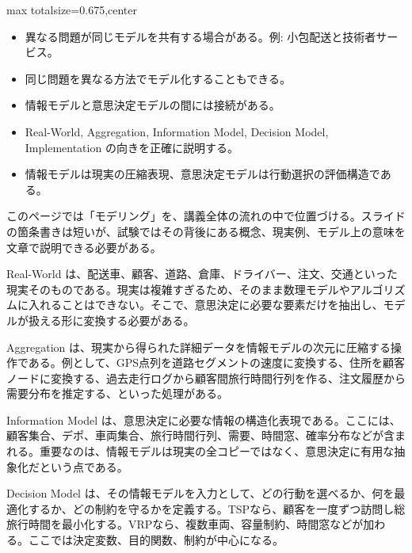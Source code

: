 \clearpage
{}
\begin{adjustbox}{max totalsize={\textwidth}{0.675\textheight},center}
\begin{minipage}{\textwidth}\scriptsize
\begin{minipage}[t]{0.485\textwidth}
\begin{itemize}
\item 異なる問題が同じモデルを共有する場合がある。例: 小包配送と技術者サービス。
\item 同じ問題を異なる方法でモデル化することもできる。
\item 情報モデルと意思決定モデルの間には接続がある。
\end{itemize}
\begin{itemize}
\item Real-World, Aggregation, Information Model, Decision Model, Implementation の向きを正確に説明する。
\item 情報モデルは現実の圧縮表現、意思決定モデルは行動選択の評価構造である。
\end{itemize}
\end{minipage}\hfill
\begin{minipage}[t]{0.485\textwidth}
このページでは「モデリング」を、講義全体の流れの中で位置づける。スライドの箇条書きは短いが、試験ではその背後にある概念、現実例、モデル上の意味を文章で説明できる必要がある。\par
Real-World は、配送車、顧客、道路、倉庫、ドライバー、注文、交通といった現実そのものである。現実は複雑すぎるため、そのまま数理モデルやアルゴリズムに入れることはできない。そこで、意思決定に必要な要素だけを抽出し、モデルが扱える形に変換する必要がある。\par
Aggregation は、現実から得られた詳細データを情報モデルの次元に圧縮する操作である。例として、GPS点列を道路セグメントの速度に変換する、住所を顧客ノードに変換する、過去走行ログから顧客間旅行時間行列を作る、注文履歴から需要分布を推定する、といった処理がある。\par
Information Model は、意思決定に必要な情報の構造化表現である。ここには、顧客集合、デポ、車両集合、旅行時間行列、需要、時間窓、確率分布などが含まれる。重要なのは、情報モデルは現実の全コピーではなく、意思決定に有用な抽象化だという点である。\par
Decision Model は、その情報モデルを入力として、どの行動を選べるか、何を最適化するか、どの制約を守るかを定義する。TSPなら、顧客を一度ずつ訪問し総旅行時間を最小化する。VRPなら、複数車両、容量制約、時間窓などが加わる。ここでは決定変数、目的関数、制約が中心になる。\par

\end{minipage}
\end{minipage}
\end{adjustbox}
